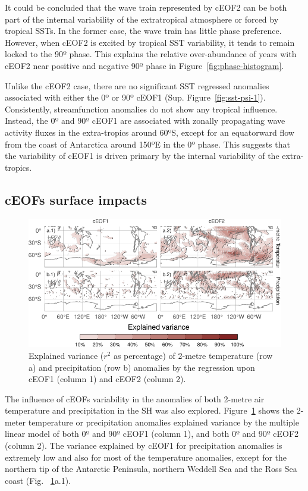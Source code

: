 \documentclass[pdflatex,sn-basic]{sn-jnl}
\theoremstyle{thmstyleone}%
\theoremstyle{thmstyletwo}%
\theoremstyle{thmstylethree}%
\begin{document}
It could be concluded that the wave train represented by cEOF2 can be both part of the internal variability of the extratropical atmosphere or forced by tropical SSTs.
In the former case, the wave train has little phase preference.
However, when cEOF2 is excited by tropical SST variability, it tends to remain locked to the 90º phase.
This explains the relative over-abundance of years with cEOF2 near positive and negative 90º phase in Figure~\ref{fig:phase-histogram}.

Unlike the cEOF2 case, there are no significant SST regressed anomalies associated with either the 0º or 90º cEOF1 (Sup. Figure~\ref{fig:sst-psi-1}).
Consistently, streamfunction anomalies do not show any tropical influence.
Instead, the 0º and 90º cEOF1 are associated with zonally propagating wave activity fluxes in the extra-tropics around 60ºS, except for an equatorward flow from the coast of Antarctica around 150ºE in the 0º phase.
This suggests that the variability of cEOF1 is driven primary by the internal variability of the extra-tropics.

\hypertarget{precipitation}{%
\subsection{cEOFs surface impacts}\label{precipitation}}

\begin{figure}
\centering
\includegraphics{../figures/pp-t2m-r2-1.pdf}
\caption{\label{fig:pp-t2m-r2}Explained variance (\(r^2\) as percentage) of 2-metre temperature (row a) and precipitation (row b) anomalies by the regression upon cEOF1 (column 1) and cEOF2 (column 2).}
\end{figure}



The influence of cEOFs variability in the anomalies of both 2-metre air temperature and precipitation in the SH was also explored.
Figure~\ref{fig:pp-t2m-r2} shows the 2-meter temperature or precipitation anomalies explained variance by the multiple linear model of both 0º and 90º cEOF1 (column 1), and both 0º and 90º cEOF2 (column 2).
The variance explained by cEOF1 for precipitation anomalies is extremely low and also for most of the temperature anomalies, except for the northern tip of the Antarctic Peninsula, northern Weddell Sea and the Ross Sea coast (Fig.~ \ref{fig:pp-t2m-r2}a.1).
\end{document}
